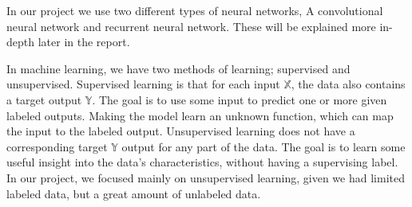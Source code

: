 \noindent
In our project we use two different types of neural networks, A convolutional neural network and recurrent neural network. These will be explained more in-depth later in the report.

\noindent
In machine learning, we have two methods of learning; supervised and unsupervised. Supervised learning is that for each input $\mathbb{X}$, the data also contains a target output $\mathbb{Y}$. The goal is to use some input to predict one or more given labeled outputs. Making the model learn an unknown function, which can map the input to the labeled output. Unsupervised learning does not have a corresponding target $\mathbb{Y}$ output for any part of the data. The goal is to learn some useful insight into the data's characteristics, without having a supervising label. In our project, we focused mainly on unsupervised learning, given we had limited labeled data, but a great amount of unlabeled data. \\
